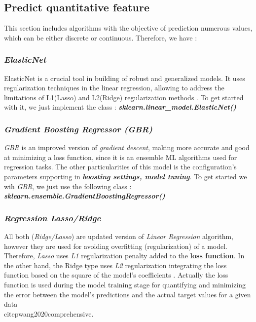 \documentclass[12pt,a4paper, oneside]{book}
\begin{document}
\subsection{Predict quantitative feature} 
This section includes algorithms with the objective of prediction numerous values, which can be either discrete or continuous. Therefore, we have :
\subsubsection{\textit{ElasticNet}}
ElasticNet is a crucial tool in building of robust and generalized models. It uses regularization techniques in the linear regression, allowing to address the limitations of L1(Lasso) and L2(Ridge) regularization methods \citep{johnsen2020elastic}. 
To get started with it, we just implement the class : \textit{\textbf{sklearn.linear\_model.ElasticNet()}}

\subsubsection{\textit{Gradient Boosting Regressor (GBR)}}
\textit{GBR} is an improved version of \textit{gradient descent}, making more accurate and good at minimizing a loss function, since it is an ensemble ML algorithms used for regression tasks. 
The other particularities of this model is the configuration's parameters supporting in \textbf{\textit{boosting settings, model tuning}}. 
To get started we wih \textit{GBR}, we just use the following class : \textit{\textbf{sklearn.ensemble.GradientBoostingRegressor()}}

\subsubsection{\textit{Regression Lasso/Ridge}}
 All both (\textit{Ridge/Lasso}) are updated version of \textit{Linear Regression} algorithm, however they are used for avoiding overfitting (regularization) of a model. Therefore, \textit{Lasso} uses \textit{L1} regularization penalty added to the \textbf{loss function}. 
 In the other hand, the Ridge type uses \textit{L2} regularization integrating the loss function based on the square of the model's coefficients \citep{hazan2011optimal}. 
 Actually the loss function is used during the model training stage for quantifying and minimizing the error between the model's predictions and the actual target values for a given data \\citep{wang2020comprehensive}.  
 
\end{document}
